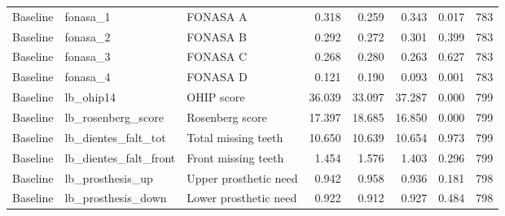 \begin{table}
\begin{tabular}[t]{lllrrrrr}
Baseline & fonasa\_1 & FONASA A & 0.318 & 0.259 & 0.343 & 0.017 & 783\\
Baseline & fonasa\_2 & FONASA B & 0.292 & 0.272 & 0.301 & 0.399 & 783\\
Baseline & fonasa\_3 & FONASA C & 0.268 & 0.280 & 0.263 & 0.627 & 783\\
\addlinespace
Baseline & fonasa\_4 & FONASA D & 0.121 & 0.190 & 0.093 & 0.001 & 783\\
Baseline & lb\_ohip14 & OHIP score & 36.039 & 33.097 & 37.287 & 0.000 & 799\\
Baseline & lb\_rosenberg\_score & Rosenberg score & 17.397 & 18.685 & 16.850 & 0.000 & 799\\
Baseline & lb\_dientes\_falt\_tot & Total missing teeth & 10.650 & 10.639 & 10.654 & 0.973 & 799\\
Baseline & lb\_dientes\_falt\_front & Front missing teeth & 1.454 & 1.576 & 1.403 & 0.296 & 799\\
\addlinespace
Baseline & lb\_prosthesis\_up & Upper prosthetic need & 0.942 & 0.958 & 0.936 & 0.181 & 798\\
Baseline & lb\_prosthesis\_down & Lower prosthetic need & 0.922 & 0.912 & 0.927 & 0.484 & 798\\
\bottomrule
\end{tabular}
\end{table}
